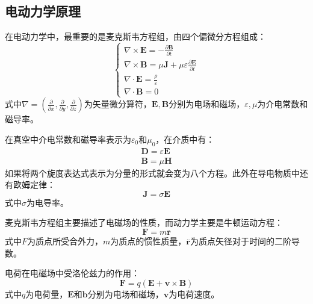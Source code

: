 \documentclass[UTF8,a4paper,10pt]{ctexart}
\begin{document}
\begin{multicols}{2}
        \subsection{电动力学原理}
        在电动力学中，最重要的是麦克斯韦方程组，由四个偏微分方程组成：
        \begin{equation}
            \left\{ \begin{array}{l}
                \nabla \times \bm{E} = -\frac{\partial \bm{B}}{\partial t}\\
                \nabla \times \bm{B} = \mu \bm{J}+\mu \varepsilon \frac{\partial \bm{E}}{\partial t}\\
                \nabla \cdot \bm{E} = \frac{\rho}{\varepsilon}\\
                \nabla \cdot \bm{B} = 0
            \end{array}\right.
        \end{equation}
        式中$\nabla = (\frac{\partial}{\partial x},\frac{\partial}{\partial y},\frac{\partial}{\partial z})$为矢量微分算符，$\bm{E},\bm{B}$分别为电场和磁场，$\varepsilon,\mu$为介电常数和磁导率。\par
        在真空中介电常数和磁导率表示为$\varepsilon_0$和$\mu_0$，在介质中有：
        \begin{equation}
            \begin{array}{c}
                \bm{D} = \varepsilon \bm{E}\\
                \bm{B} = \mu \bm{H}
            \end{array}
        \end{equation}
        如果将两个旋度表达式表示为分量的形式就会变为八个方程。此外在导电物质中还有欧姆定律：
        \begin{equation}
            \bm{J} = \sigma \bm{E}
        \end{equation}
        式中$\sigma$为电导率。\par
        麦克斯韦方程组主要描述了电磁场的性质，而动力学主要是牛顿运动方程：
        \begin{equation}
            \bm{F} = m\stackrel{..}{\bm{r}}
        \end{equation}
        式中$F$为质点所受合外力，$m$为质点的惯性质量，$\stackrel{..}{\bm{r}}$为质点矢径对于时间的二阶导数。\par
        电荷在电磁场中受洛伦兹力的作用：
        \begin{equation}
            \bm{F} = q(\bm{E}+\bm{v}\times\bm{B})
        \end{equation}
        式中$q$为电荷量，$\bm{E}$和$\bm{b}$分别为电场和磁场，$\bm{v}$为电荷速度。\par

\end{multicols}
\end{document}
